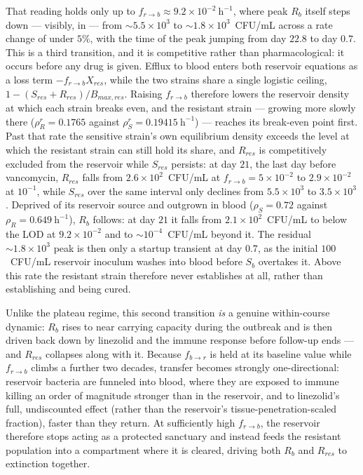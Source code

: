 \documentclass[11pt]{article}
\begin{document}
That reading holds only up to $f_{r \to b} \approx 9.2\times10^{-2}
~\mathrm{h}^{-1}$, where peak $R_b$ itself steps down --- visibly, in
 --- from $\sim5.5\times10^{3}$ to
$\sim1.8\times10^{3}$~CFU/mL across a rate change of under $5\%$, with the
time of the peak jumping from day $22.8$ to day $0.7$. This is a third
transition, and it is competitive rather than pharmacological: it occurs
before any drug is given. Efflux to blood enters both reservoir equations
as a loss term $-f_{r \to b}X_{res}$, while the two strains share a single
logistic ceiling, $1 - (S_{res}+R_{res})/B_{max,res}$. Raising
$f_{r \to b}$ therefore lowers the reservoir density at which each strain
breaks even, and the resistant strain --- growing more slowly there
($\rho_R^r = 0.1765$ against $\rho_S^r = 0.19415~\mathrm{h}^{-1}$) ---
reaches its break-even point first. Past that rate the sensitive strain's
own equilibrium density exceeds the level at which the resistant strain
can still hold its share, and $R_{res}$ is competitively excluded from the
reservoir while $S_{res}$ persists: at day $21$, the last day before
vancomycin, $R_{res}$ falls from $2.6\times10^{2}$~CFU/mL at
$f_{r \to b} = 5\times10^{-2}$ to $2.9\times10^{-2}$ at $10^{-1}$, while
$S_{res}$ over the same interval only declines from $5.5\times10^{3}$ to
$3.5\times10^{3}$. Deprived of its reservoir source and outgrown in blood
($\rho_S = 0.72$ against $\rho_R = 0.649~\mathrm{h}^{-1}$), $R_b$ follows:
at day $21$ it falls from $2.1\times10^{2}$~CFU/mL to below the LOD at
$9.2\times10^{-2}$ and to $\sim10^{-4}$~CFU/mL beyond it. The residual
$\sim1.8\times10^{3}$ peak is then only a startup transient at day
$0.7$, as the initial $100$~CFU/mL reservoir inoculum washes into blood
before $S_b$ overtakes it. Above this rate the resistant strain therefore
never establishes at all, rather than establishing and being cured.

Unlike the plateau regime, this second transition
\textit{is} a genuine within-course dynamic: $R_b$ rises to near carrying
capacity during the outbreak and is then driven back down by linezolid and
the immune response before follow-up ends --- and $R_{res}$ collapses along
with it. Because $f_{b \to r}$ is held at its baseline value while $f_{r \to
b}$ climbs a further two decades, transfer becomes strongly
one-directional: reservoir bacteria are funneled into blood, where they are
exposed to immune killing an order of magnitude stronger than in the
reservoir, and to linezolid's full, undiscounted effect (rather than the
reservoir's tissue-penetration-scaled fraction), faster than they return. At
sufficiently high $f_{r \to b}$, the reservoir therefore stops acting as a
protected sanctuary and instead feeds the resistant population into a
compartment where it is cleared, driving both $R_b$ and $R_{res}$ to
extinction together.
\end{document}

